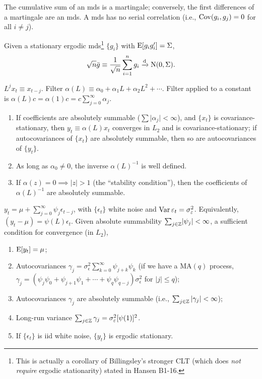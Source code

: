 \documentclass[8pt,letterpaper, landscape]{extarticle} %
\begin{document}
\begin{multicols}{3}
\begin{description}
The cumulative sum of an mds is a martingale; conversely, the first differences of a martingale are an mds. A mds has no serial correlation (i.e., $ \operatorname{Cov} (g_i, g_j) = 0 $ for all $ i \neq j $).

 Given a stationary ergodic mds\footnote{This is actually a corollary of Billingsley's stronger CLT (which does \textit{not require} ergodic stationarity) stated in Hansen B1-16.} $ \{ g_i \} $ with $ \operatorname{E} [g_i g_{i}' ] = \Sigma $,
$$ \sqrt{n} \bar{g} \equiv \frac{1}{\sqrt{n}} \sum_{i=1}^{n} g_i \xrightarrow{\text{d}} \operatorname{N} (0, \Sigma). $$

 $ L^{j} x_{t} \equiv x_{t-j} $. Filter $ \alpha (L) \equiv \alpha_0 + \alpha_1 L + \alpha_2 L^2 + \dotsb $. Filter applied to a constant is $ \alpha (L) c = \alpha (1) c = c \sum_{j=0}^{\infty} \alpha_j $.
\begin{enumerate}
\item If coefficients are absolutely summable ($ \sum \lvert \alpha_j \rvert < \infty $), and $ \{ x_t \} $ is covariance-stationary, then $ y_t \equiv \alpha (L) x_t $ converges in $ L_2 $ and is covariance-stationary; if autocovariances of $ \{ x_t \} $ are absolutely summable, then so are autocovariances of $ \{ y_t \} $.
\item As long as $ \alpha_0 \neq 0 $, the inverse $ \alpha (L)^{-1} $ is well defined.
\item If $ \alpha (z) = 0 \implies \lvert z \rvert > 1 $ (the ``stability condition''), then the coefficients of $ \alpha (L)^{-1} $ are absolutely summable.
\end{enumerate}

 $ y_t = \mu + \sum _{j=0}^{\infty} \psi_{j} \epsilon_{t-j} $, with $ \{ \epsilon_t \} $ white noise and $ \operatorname{Var} \varepsilon_t = \sigma^2_\varepsilon $. Equivalently, $ (y_t - \mu) = \psi (L) \epsilon_t $. Given absolute summability $ \sum_{j \in \mathbb{Z}} \lvert \psi_j \rvert < \infty $, a sufficient condition for convergence (in $ L_2 $),
\begin{enumerate}
\item $ \operatorname{E} [y_t] = \mu $;
\item Autocovariances $ \gamma_j = \sigma^{2}_\epsilon \sum_{k=0}^{\infty} \psi_{j+k} \psi_{k} $ (if we have a $ \text{MA}(q) $ process, $ \gamma_j = (\psi_j \psi_0 + \psi_{j+1} \psi_{1} + \dotsb + \psi_{q} \psi_{q-j}) \sigma^{2}_\epsilon $ for $ | j | \leq q $);
\item Autocovariances $ \gamma_j $ are absolutely summable (i.e., $ \sum_{j \in \mathbb{Z}} | \gamma_j | < \infty $);
\item Long-run variance $ \sum_{j \in \mathbb{Z}} \gamma_{j} = \sigma^2_\varepsilon [\psi (1)]^{2} $.
\item If $ \{ \epsilon_t \} $ is iid white noise, $ \{ y_t \} $ is ergodic stationary.
\end{enumerate}


\end{description}
\end{multicols}
\end{document}
